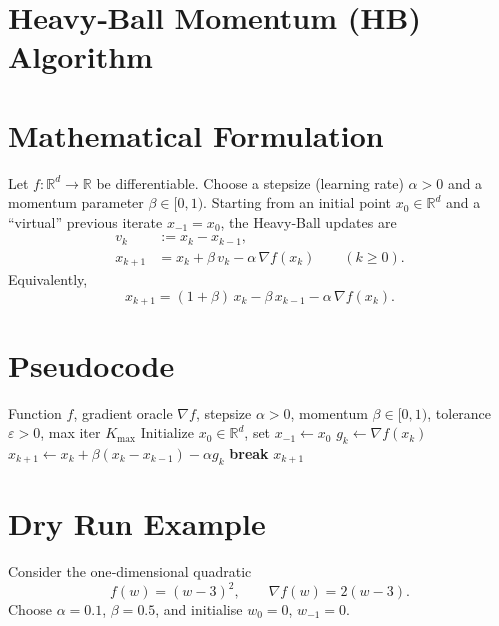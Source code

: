 \documentclass[11pt]{article}
\newcommand{\norm}[1]{\left\lVert#1\right\rVert}
\newcommand{\R}{\mathbb{R}}
\begin{document}
\section*{Heavy‑Ball Momentum (HB) Algorithm}

\section*{Mathematical Formulation}
Let $f:\R^{d}\to\R$ be differentiable.  Choose a stepsize (learning rate) $\alpha>0$ and a momentum parameter $\beta\in[0,1)$.  
Starting from an initial point $x_{0}\in\R^{d}$ and a ``virtual'' previous iterate $x_{-1}=x_{0}$, the Heavy‑Ball updates are
\[
\boxed{
\begin{aligned}
   v_{k}      &:= x_{k}-x_{k-1},\\
   x_{k+1}    &= x_{k} + \beta\,v_{k} - \alpha\,\nabla f(x_{k})   \qquad (k\ge 0).
\end{aligned}}
\tag{HB}
\]
Equivalently,
\[
x_{k+1}= (1+\beta)\,x_{k}-\beta\,x_{k-1}-\alpha\,\nabla f(x_{k}).
\]

\section*{Pseudocode}
\begin{algorithm}[H]
\caption{Heavy‑Ball Momentum}
\begin{algorithmic}[1]
\REQUIRE Function $f$, gradient oracle $\nabla f$, stepsize $\alpha>0$, momentum $\beta\in[0,1)$, tolerance $\varepsilon>0$, max iter $K_{\max}$
\STATE Initialize $x_{0}\in\R^{d}$, set $x_{-1}\gets x_{0}$
    \STATE $g_{k}\gets \nabla f(x_{k})$
    \STATE $x_{k+1}\gets x_{k}+\beta (x_{k}-x_{k-1})-\alpha g_{k}$
    \IF{$\norm{g_{k}}\le \varepsilon$}
        \STATE \textbf{break}
    \ENDIF
\ENDFOR
\RETURN $x_{k+1}$
\end{algorithmic}
\end{algorithm}

\section*{Dry Run Example}
Consider the one‑dimensional quadratic
\[
f(w)=(w-3)^{2},\qquad \nabla f(w)=2(w-3).
\]
Choose $\alpha=0.1$, $\beta=0.5$, and initialise $w_{0}=0$, $w_{-1}=0$.
\end{document}
